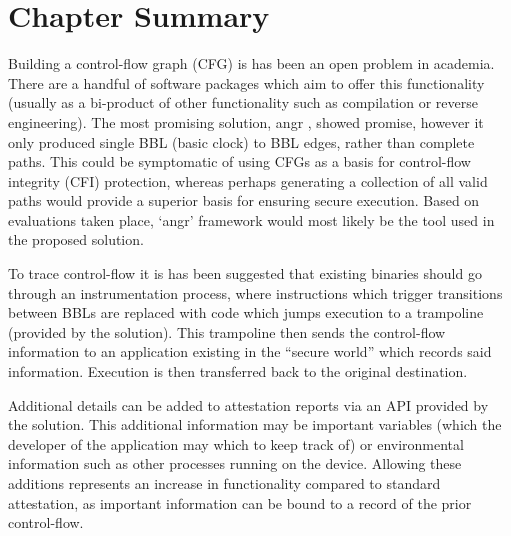 \section{Chapter Summary}
Building a control-flow graph (CFG) is has been an open problem in academia. There are a handful of software packages which aim to offer this functionality (usually as a bi-product of other functionality such as compilation or reverse engineering). The most promising solution, angr \cite{Shoshitaishvili2016}, showed promise, however it only produced single BBL (basic clock) to BBL edges, rather than complete paths. This could be symptomatic of using CFGs as a basis for control-flow integrity (CFI) protection, whereas perhaps generating a collection of all valid paths would provide a superior basis for ensuring secure execution. Based on evaluations taken place, `angr' framework would most likely be the tool used in the proposed solution.

To trace control-flow it is has been suggested that existing binaries should go through an instrumentation process, where instructions which trigger transitions between BBLs are replaced with code which jumps execution to a trampoline (provided by the solution). This trampoline then sends the control-flow information to an application existing in the ``secure world'' which records said information. Execution is then transferred back to the original destination.

Additional details can be added to attestation reports via an API provided by the solution. This additional information may be important variables (which the developer of the application may which to keep track of) or environmental information such as other processes running on the device. Allowing these additions represents an increase in functionality compared to standard attestation, as important information can be bound to a record of the prior control-flow.